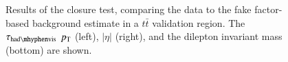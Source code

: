\begin{figure}[htbp]
{	}
\caption{\label{fig:tauclosure} Results of the closure test, comparing the data to the fake factor-based background estimate in a $t\bar{t}$ validation region. The $\tauhadvis$ $p_{\text{T}}$ (left), $|\eta|$ (right), and the dilepton invariant mass (bottom) are shown.}
\end{figure}









